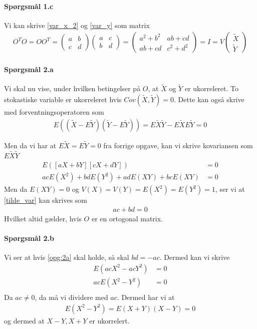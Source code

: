 \documentclass{article} %
\begin{document}
\paragraph*{Spørgsmål 1.c}
Vi kan skrive \cref{var_x_2} og \cref{var_y} som matrix
\begin{align}
O^TO=OO^T=
	\begin{pmatrix}
  a & b \\
  c & d
	\end{pmatrix}
	\begin{pmatrix}
  a & c \\
  b & d
	\end{pmatrix}
	=
	\begin{pmatrix}
	a^2 + b^2 & ab+cd \\
	ab+cd & c^2 + d^2
	\end{pmatrix}
  =I=V
  \begin{pmatrix}
  \tilde{X} \\
  \tilde{Y}
  \end{pmatrix}
\end{align}


\paragraph*{Spørgsmål 2.a}
Vi skal nu vise, under hvilken betingelser på \(O\), at \(\tilde{X}\) og \(\tilde{Y}\) er ukorreleret. To stokastiske variable er ukorreleret hvis \(Cov(\tilde{X},\tilde{Y})=0\). Dette kan også skrive med forventningsoperatoren som
\begin{align}
   E((\tilde{X}-E\tilde{Y})(\tilde{Y}-E\tilde{Y}))=E\tilde{X}\tilde{Y}-E\tilde{X}E\tilde{Y}=0
\end{align}

Men da vi har at \(E\tilde{X}=E\tilde{Y}=0\) fra forrige opgave, kan vi skrive kovariansen som \(E\tilde{X}\tilde{Y}\)
\begin{align}
	E\left(\left[aX+bY\right]\left[cX+dY\right]\right) &=0 \\
	acE(X^2)+bdE(Y^2)+adE(XY)+bcE(XY)                  &=0 \label{tilde_var}
\end{align}
Men da \(E(XY)=0\) og \(V(X)=V(Y)=E(X^2)=E(Y^2)=1\), ser vi at \cref{tilde_var} kan skrives som
\begin{align}
    ac+bd=0 \label{opg:2a}
\end{align}
Hvilket altid gælder, hvis \(O\) er en ortogonal matrix.
\paragraph{Spørgsmål 2.b}
Vi ser at hvis \cref{opg:2a} skal holde, så skal \(bd=-ac\). Dermed kan vi skrive
\begin{align}
    E(acX^2-acY^2) & = 0 \\
    acE(X^2-Y^2) & = 0 \\
\end{align}
Da \(ac\ne 0\), da må vi dividere med \(ac\). Dermed har vi at
\begin{align}
    E(X^2-Y^2)=E(X+Y)(X-Y)=0
\end{align}
og dermed at \(X-Y,X+Y\) er ukorrelert.
\end{document}
